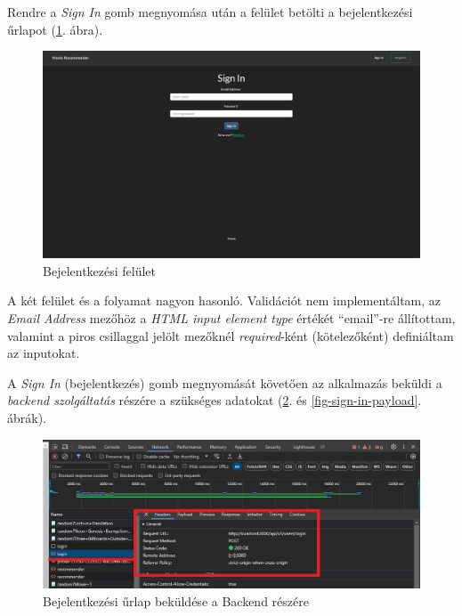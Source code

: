 \documentclass[
]{thesis-ekf}
\theoremstyle{definition}
\theoremstyle{remark}
\begin{document}
Rendre a \emph{Sign In} gomb megnyomása után a felület betölti a bejelentkezési űrlapot (\ref{fig-sign-in}. ábra).

\begin{figure}[H]
	\centering
	\includegraphics[width=14cm]{images/frontend-login-1.png}
	\caption[Bejelentkezési felület]{Bejelentkezési felület}
	\label{fig-sign-in}
\end{figure}

A két felület és a folyamat nagyon hasonló. Validációt nem implementáltam, az \emph{Email Address} mezőhöz a \emph{HTML input element type} értékét ``email''-re állítottam, valamint a piros csillaggal jelölt mezőknél \emph{required}-ként (kötelezőként) definiáltam az inputokat.

A \emph{Sign In} (bejelentkezés) gomb megnyomását követően az alkalmazás beküldi a \emph{backend szolgáltatás} részére a szükséges adatokat (\ref{fig-sign-in-network}. és \ref{fig-sign-in-payload}. ábrák).

\begin{figure}[H]
	\centering
	\includegraphics[width=14cm]{images/frontend-login-2.png}
	\caption[Bejelentkezési űrlap beküldése a Backend részére]{Bejelentkezési űrlap beküldése a Backend részére}
	\label{fig-sign-in-network}
\end{figure}
\end{document}
